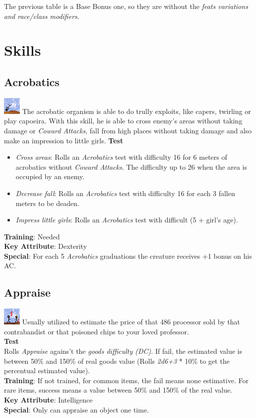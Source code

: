 \documentclass[ letterpaper,12pt]{article}
\begin{document}
The previous table is a Base Bonus one, so they are without the {\it feats variations and race/class modifiers}.\\

\section{Skills}

\subsection{Acrobatics}
\includegraphics{../data/skills/Img/acrobacias.png}
 The acrobatic organism is able to do trully exploits, like capers, twirling or play capoeira. With this skill, he is able to cross enemy's areas without taking damage or {\it Coward Attacks}, fall from high places without taking damage and also make an impression to little girls.
{\bf Test}
\begin{itemize}
\item{{\it Cross areas}: Rolls an {\it Acrobatics} test with difficulty 16 for 6 meters of acrobatics without {\it Coward Attacks}. The difficulty up to 26 when the area is occupied by an enemy.}
\item{{\it Decrease fall}: Rolls an {\it Acrobatics} test with difficulty 16 for each 3 fallen meters to be deaden.}
\item{{\it Impress little girls}: Rolls an {\it Acrobatics} test with difficult (5 + girl's age).}
\end{itemize}
{\bf Training}: Needed\\
{\bf Key Attribute}: Dexterity\\
{\bf Special}: For each 5 {\it Acrobatics} graduations the creature receives +1 bonus on his AC.

\subsection{Appraise}
\includegraphics{../data/skills/Img/avaliar.png}
Usually utilized to estimate the price of that 486 processor sold by that contrabandist or that poisoned chips to your loved professor.\\
{\bf Test}\\
Rolls {\it Appraise} agains't the {\it goods difficulty (DC)}. If fail, the estimated value is between 50\% and 150\% of real goods value (Rolls {\it 2d6+3} * 10\% to get the percentual estimated value).\\
{\bf Training}: If not trained, for common items, the fail means none estimative. For rare items, success means a value between 50\% and 150\% of the real value.\\
{\bf Key Attribute}: Intelligence\\
{\bf Special}: Only can appraise an object one time.
\end{document}
